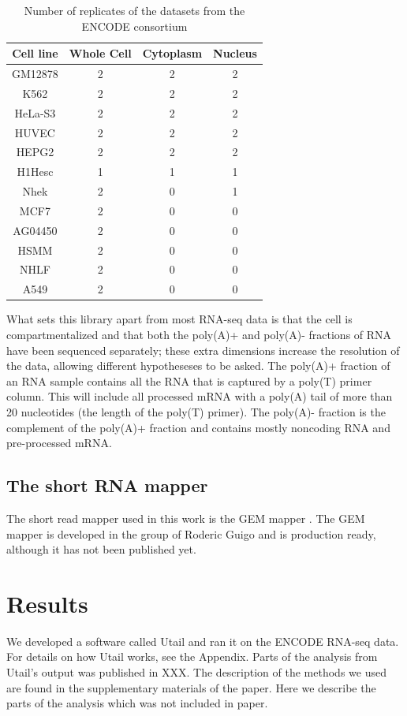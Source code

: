 \begin{table}
	\centering
	\begin{tabular}{cccc}
	  Cell line & Whole Cell & Cytoplasm & Nucleus \\
	  \midrule
	  GM12878 & 2 & 2 & 2 \\
	  K562 & 2 & 2 & 2 \\
	  HeLa-S3 & 2 & 2 & 2 \\
	  HUVEC & 2 & 2 & 2 \\
	  HEPG2 & 2 & 2 & 2 \\
	  H1Hesc & 1 & 1 & 1 \\
	  Nhek & 2 & 0 & 1 \\
	  MCF7 & 2 & 0 & 0 \\
	  AG04450 & 2 & 0 & 0 \\
	  HSMM & 2 & 0 & 0 \\
	  NHLF & 2 & 0 & 0 \\
	  A549 & 2 & 0 & 0 \\
	\end{tabular}
	\caption{Number of replicates of the datasets from the ENCODE consortium}
	\label{tab:Datasets}
\end{table}

What sets this library apart from most RNA-seq data is that the cell is
compartmentalized and that both the poly(A)+ and poly(A)- fractions of RNA have
been sequenced separately; these extra dimensions increase the resolution of
the data, allowing different hypotheseses to be asked. The poly(A)+ fraction of
an RNA sample contains all the RNA that is captured by a poly(T) primer column.
This will include all processed mRNA with a poly(A) tail of more than 20
nucleotides (the length of the poly(T) primer). The poly(A)- fraction is the
complement of the poly(A)+ fraction and contains mostly noncoding RNA and
pre-processed mRNA.

\subsection{The short RNA mapper}
The short read mapper used in this work is the GEM mapper
\cite{ribeca_gem_2010}. The GEM mapper is developed in the group of Roderic
Guigo and is production ready, although it has not been published yet.

\section{Results}
We developed a software called Utail and ran it on the ENCODE RNA-seq data.
For details on how Utail works, see the Appendix. Parts of the analysis from
Utail's output was published in XXX. The description of the methods we used are
found in the supplementary materials of the paper. Here we describe the parts
of the analysis which was not included in paper.

